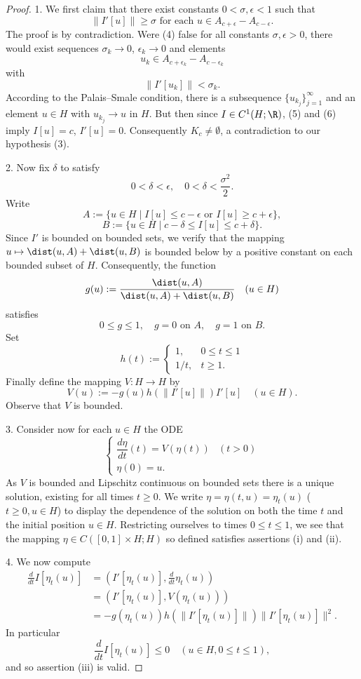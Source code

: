 \begin{proof}
1. We first claim that there exist constants $0 < \sigma, \epsilon < 1$ such that
\[
\|I'[u]\| \ge \sigma \text{ for each } u \in A_{c+\epsilon} - A_{c-\epsilon}.
\tag{4}
\]
The proof is by contradiction. Were (4) false for all constants $\sigma, \epsilon > 0$, there would exist sequences $\sigma_k \to 0$, $\epsilon_k \to 0$ and elements
\[
u_k \in A_{c+\epsilon_k} - A_{c-\epsilon_k}
\tag{5}
\]
with
\[
\|I'[u_k]\| < \sigma_k.
\tag{6}
\]
According to the Palais--Smale condition, there is a subsequence $\{u_{k_j}\}_{j=1}^\infty$ and an element $u \in H$ with $u_{k_j} \to u$ in $H$. But then since $I \in C^1(H; \R)$, (5) and (6) imply $I[u] = c$, $I'[u] = 0$. Consequently $K_c \ne \emptyset$, a contradiction to our hypothesis (3).

2. Now fix $\delta$ to satisfy
\[
0 < \delta < \epsilon, \quad 0 < \delta < \frac{\sigma^2}{2}.
\tag{7}
\]
Write
\[
A := \{u \in H \mid I[u] \le c - \epsilon \text{ or } I[u] \ge c + \epsilon\},
\]
\[
B := \{u \in H \mid c - \delta \le I[u] \le c + \delta\}.
\]
Since $I'$ is bounded on bounded sets, we verify that the mapping $u \mapsto \dist(u, A) + \dist(u, B)$ is bounded below by a positive constant on each bounded subset of $H$. Consequently, the function
\[
g(u) := \frac{\dist(u, A)}{\dist(u, A) + \dist(u, B)} \quad (u \in H)
\]
satisfies
\[
0 \le g \le 1, \quad g = 0 \text{ on } A, \quad g = 1 \text{ on } B.
\tag{8}
\]
Set
\[
h(t) := \begin{cases} 1, & 0 \le t \le 1 \\ 1/t, & t \ge 1. \end{cases}
\tag{9}
\]
Finally define the mapping $V : H \to H$ by
\[
V(u) := -g(u)h(\|I'[u]\|)I'[u] \quad (u \in H).
\tag{10}
\]
Observe that $V$ is bounded.

3. Consider now for each $u \in H$ the ODE
\[
\begin{cases} \dfrac{d\eta}{dt}(t) = V(\eta(t)) & (t > 0) \\ \eta(0) = u. \end{cases}
\tag{11}
\]
As $V$ is bounded and Lipschitz continuous on bounded sets there is a unique solution, existing for all times $t \ge 0$. We write $\eta = \eta(t, u) = \eta_t(u)$ ($t \ge 0, u \in H$) to display the dependence of the solution on both the time $t$ and the initial position $u \in H$. Restricting ourselves to times $0 \le t \le 1$, we see that the mapping $\eta \in C([0, 1] \times H; H)$ so defined satisfies assertions (i) and (ii).

4. We now compute
\[
\begin{aligned}
\frac{d}{dt}I[\eta_t(u)] &= \left( I'[\eta_t(u)], \frac{d}{dt}\eta_t(u) \right) \\
&= (I'[\eta_t(u)], V(\eta_t(u))) \\
&= -g(\eta_t(u))h(\|I'[\eta_t(u)]\|) \|I'[\eta_t(u)]\|^2.
\end{aligned}
\tag{12}
\]
In particular
\[
\frac{d}{dt}I[\eta_t(u)] \le 0 \quad (u \in H, 0 \le t \le 1),
\]
and so assertion (iii) is valid.


\end{proof}
